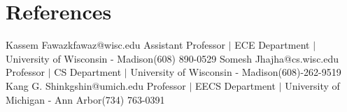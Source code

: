 \section{References}
  \CVSubHeadingListStart
    \CVSubheading
      {Kassem Fawaz}{kfawaz@wisc.edu}
      {Assistant Professor $|$ ECE Department $|$ University of Wisconsin - Madison}{(608) 890-0529}
    \CVSubheading
      {Somesh Jha}{jha@cs.wisc.edu}
      {Professor $|$ CS Department $|$ University of Wisconsin - Madison}{(608)-262-9519}
    \CVSubheading
      {Kang G. Shin}{kgshin@umich.edu}
      {Professor $|$ EECS Department $|$ University of Michigan - Ann Arbor}{(734) 763-0391}

  \CVSubHeadingListEnd